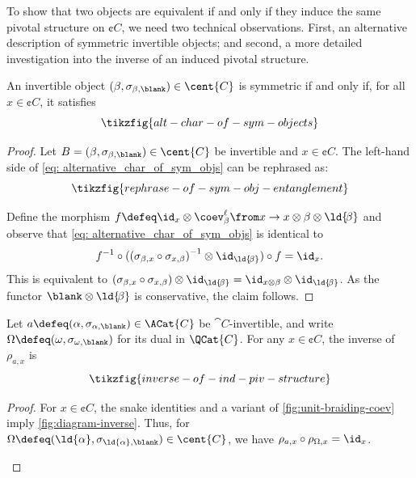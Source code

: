 To show that two objects are equivalent if and only if they induce the same pivotal structure on \(\cent{C}\),
we need two technical observations.
First, an alternative description of symmetric invertible objects;
and second, a more detailed investigation into the inverse of an induced pivotal structure.

\begin{lemma}\label{lem: alternative_char_of_sym_objs}
  An invertible object \((\beta, \sigma_{\beta, \blank}) \in \cent{C}\) is symmetric
  if and only if, for all \(x \in \cent{C}\), it satisfies
  \begin{equation}\label{eq: alternative_char_of_sym_objs}
    \tikzfig{alt-char-of-sym-objects}
  \end{equation}
\end{lemma}
\begin{proof}
  Let \(B = (\beta, \sigma_{\beta, \blank}) \in \cent{C}\) be invertible and \(x \in \cent{C}\).
  The left-hand side of \cref{eq: alternative_char_of_sym_objs} can be rephrased as:
  \[
    \tikzfig{rephrase-of-sym-obj-entanglement}
  \]

  Define the morphism \(f \defeq \id_x \otimes \coev_\beta^{\ell} \from x \to x \otimes \beta \otimes \ld{\!\beta}\) and
  observe that \cref{eq: alternative_char_of_sym_objs} is identical to
  \[
    f^{-1} \circ ({(\sigma_{\beta, x} \circ \sigma_{x, \beta})}^{-1} \otimes \id_{\ld{\!\beta}}) \circ f = \id_x.
  \]
  This is equivalent to \((\sigma_{\beta, x} \circ \sigma_{x, \beta}) \otimes \id_{\ld{\!\beta}} = \id_{x \otimes \beta} \otimes \id_{\ld{\!\beta}}\).
  As the functor \(\blank \otimes \ld{\!\beta}\) is conservative, the claim follows.
\end{proof}

\begin{lemma}\label{lem: inverse_of_ind_piv_struc}
  Let \(a \defeq (\alpha, \sigma_{\alpha,\blank}) \in \ACat{C}\) be \(\cat{C}\)\hyp{}invertible,
  and write \(\Omega \defeq (\omega, \sigma_{\omega, \blank })\) for its dual in \(\QCat{C}\).
  For any \(x \in \cent{C}\), the inverse of \(\rho_{a, x}\) is
  \[
    \tikzfig{inverse-of-ind-piv-structure}
  \]
\end{lemma}
\begin{proof}
  For \(x \in \cent{C}\),
  the snake identities and a variant of \cref{fig:unit-braiding-coev} imply \cref{fig:diagram-inverse}.
  Thus, for \(\Omega \defeq (\ld{\alpha}, \sigma_{\ld{\alpha}, \blank }) \in \cent{C}\),
  we have \(\rho_{a,x} \circ \rho_{\Omega, x} = \id_x\).
  \begin{figure}[htbp]
    \centering
    \vspace{-.5cm}%
  \end{figure}
\end{proof}

